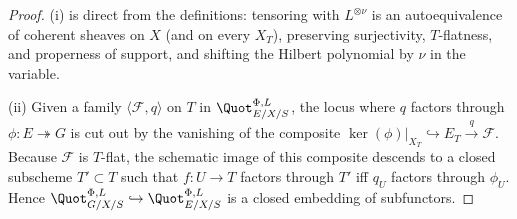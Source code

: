 \begin{proof}

  (i) is direct from the definitions: tensoring with \(L^{\otimes \nu}\) is
  an autoequivalence of coherent sheaves on \(X\) (and on every \(X_T\)),
  preserving surjectivity, \(T\)-flatness, and properness of support, and
  shifting the Hilbert polynomial by \(\nu\) in the variable.

  (ii) Given a family \(\langle \mathcal{F}, q\rangle\) on \(T\) in
  \(\Quot^{\Phi,L}_{E/X/S}\), the locus where \(q\) factors through
  \(\phi : E \twoheadrightarrow G\) is cut out by the vanishing of the
  composite \(\ker(\phi)|_{X_T} \hookrightarrow E_T \xrightarrow{q}
  \mathcal{F}\). Because \(\mathcal{F}\) is \(T\)-flat, the schematic image of
  this composite descends to a closed subscheme \(T' \subset T\) such that
  \(f : U \to T\) factors through \(T'\) iff \(q_U\) factors through \(\phi_U\).
  Hence \(\Quot^{\Phi,L}_{G/X/S} \hookrightarrow \Quot^{\Phi,L}_{E/X/S}\)
  is a closed embedding of subfunctors.
\end{proof}

